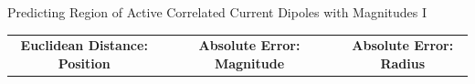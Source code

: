 \documentclass[aspectratio=169, 9pt]{beamer}
\begin{document}
\begin{frame}{Predicting Region of Active Correlated Current Dipoles with Magnitudes I}
\begin{itemize}
      \hspace*{10cm}
      \begin{table}[]
        \hspace*{-0.5cm}
        \begin{tabular}{|ccc|l|ccc|l|ccc|}
        \cline{1-3} \cline{5-7} \cline{9-11}
        \multicolumn{3}{|c|}{\cellcolor[HTML]{CBCEFB}\textbf{Euclidean Distance: Position}}                                                                                                                                                                                                                             & \textbf{}             & \multicolumn{3}{c|}{\cellcolor[HTML]{CBCEFB}\textbf{Absolute Error: Magnitude}}                                                                                                                                                                                                                             & \textbf{}             & \multicolumn{3}{c|}{\cellcolor[HTML]{CBCEFB}\textbf{Absolute Error: Radius}}                                                                                                                                                                                                                                   \\ \cline{1-3} \cline{5-7} \cline{9-11}

\end{tabular}
\end{table}
\end{itemize}
\end{frame}
\end{document}

